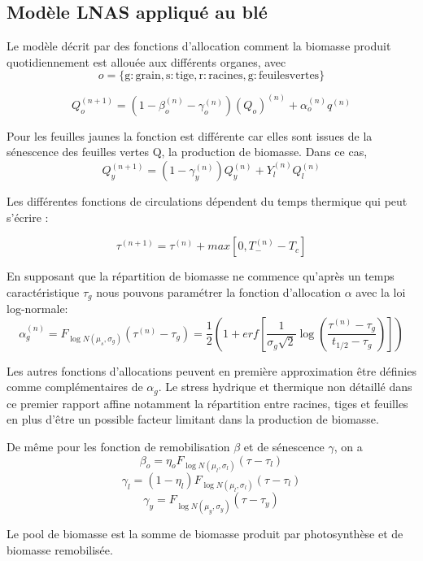 \subsection{Modèle LNAS appliqué au blé}
Le modèle décrit par des fonctions d'allocation comment la biomasse produit quotidiennement est allouée aux différents organes, avec 
\[ o = \{\mathrm{g:grain, s:tige, r:racines, g:feuiles vertes}\} \]

\[ {Q_o^{(n+1)}} = (1-\beta_o^{(n)}-\gamma_o^{(n)} )(Q_o)^{(n)} +\alpha_o^{(n)}q^{(n)} \]

Pour les feuilles jaunes la fonction est différente car elles sont issues de la sénescence des feuilles vertes Q, la production de biomasse. 
Dans ce cas, 
\[ {Q_y^{(n+1)}}=(1-\gamma_y^{(n)})Q_y^{(n)}+Y_l^{(n)}Q_l^{(n)} \]

Les différentes fonctions de circulations dépendent du temps thermique qui peut s'écrire :

\[ {\tau}^{(n+1)}=\tau^{(n)}+max[0,T_-^{(n)}-T_c] \]

En supposant que la répartition de biomasse ne commence qu'après un temps caractéristique $\tau_g$ nous pouvons paramétrer la fonction d'allocation $\alpha$ avec la loi log-normale:
\[ {\alpha_g^{(n)}}=F_{\log N(\mu_s,\sigma_g)}(\tau^{(n)}-\tau_g)=\frac{1}{2} (1+erf[\frac{1}{\sigma_g \sqrt{2}}\log (\frac{\tau^{(n)}-\tau_g}{t_{1/2}-\tau_g})]) \]

Les autres fonctions d'allocations peuvent en première approximation être définies comme complémentaires de $\alpha_g$. Le stress hydrique et thermique non détaillé dans ce premier rapport affine notamment la répartition entre racines, tiges et feuilles en plus d'être un possible facteur limitant dans la production de biomasse.

De même pour les fonction de remobilisation $\beta $ et de sénescence $\gamma$, on a
\[ {\beta_o}=\eta_o F_{\log N(\mu_l, \sigma_l)}(\tau-\tau_l) \]
\[ {\gamma_l}=(1-\eta_l)F_{\log N(\mu_l, \sigma_l)}(\tau-\tau_l) \]
\[ {\gamma_y}=F_{\log N(\mu_y, \sigma_y)}(\tau-\tau_y) \]

Le pool de biomasse est la somme de biomasse produit par photosynthèse et de biomasse remobilisée.

